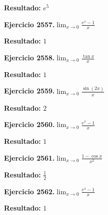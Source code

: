 \documentclass[10pt,a4paper]{article}
\begin{document}
\begin{solbox}
\textbf{Resultado:} \(\displaystyle e^{5}\)
\end{solbox}

\begin{ejbox}
\textbf{Ejercicio 2557.}\quad $\lim_{x\to 0} \frac{e^x-1}{x}$
\end{ejbox}

\begin{solbox}
\textbf{Resultado:} \(\displaystyle 1\)
\end{solbox}

\begin{ejbox}
\textbf{Ejercicio 2558.}\quad $\lim_{x\to 0} \frac{\tan x}{x}$
\end{ejbox}

\begin{solbox}
\textbf{Resultado:} \(\displaystyle 1\)
\end{solbox}

\newpage
\begin{ejbox}
\textbf{Ejercicio 2559.}\quad $\lim_{x\to 0} \frac{\sin(2x)}{x}$
\end{ejbox}

\begin{solbox}
\textbf{Resultado:} \(\displaystyle 2\)
\end{solbox}

\begin{ejbox}
\textbf{Ejercicio 2560.}\quad $\lim_{x\to 0} \frac{e^x-1}{x}$
\end{ejbox}

\begin{solbox}
\textbf{Resultado:} \(\displaystyle 1\)
\end{solbox}

\begin{ejbox}
\textbf{Ejercicio 2561.}\quad $\lim_{x\to 0} \frac{1-\cos x}{x^2}$
\end{ejbox}

\begin{solbox}
\textbf{Resultado:} \(\displaystyle \frac{1}{2}\)
\end{solbox}

\newpage
\begin{ejbox}
\textbf{Ejercicio 2562.}\quad $\lim_{x\to 0} \frac{e^x-1}{x}$
\end{ejbox}

\begin{solbox}
\textbf{Resultado:} \(\displaystyle 1\)
\end{solbox}
\end{document}
